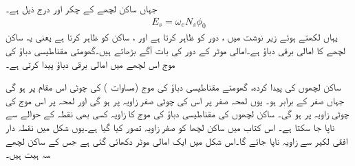 جہاں  ساکن لچھے کے چکر  اور  درج ذیل ہے۔
\begin{align}\label{مساوات_امالی_ساکن_لچھوں_میں_امالی_برقی_دباو}
E_s=\omega_e N_s \phi_0
\end{align}
یہاں   لکھتے ہوئے  زیر نوشت  میں  ،  دور  کو ظاہر کرتا ہے اور ، ساکن کو ظاہر کرتا ہے یعنی یہ ساکن   لچھے کا امالی برقی دباؤ ہے۔امالی موٹر کے  دور   کی بات آگے بڑھاتے ہیں۔گھومتی مقناطیسی دباؤ کی موج اس  لچھے میں امالی برقی دباؤ  پیدا کرتی ہے۔

ساکن لچھوں کی پیدا کردہ، گھومتے مقناطیسی دباؤ کی موج (مساوات )  کی چوٹی اس مقام پر ہو گی جہاں  صفر کے برابر ہو۔ یوں لمحہ صفر پر اس کی چوٹی صفر زاویہ
  پر ہو گی اور لمحہ  پر اس موج کی چوٹی زاویہ  پر ہو گی۔ ساکن لچھوں کی مقناطیسی دباؤ کی موج کا زاویہ کسی بھی نقطہ کے حوالے سے ناپا  جا سکتا ہے۔ اس کتاب میں ساکن لچھا   کو صفر زاویہ تصور کیا گیا ہے۔یوں شکل   میں  نقطہ دار افقی لکیر سے  زاویہ   ناپا جائے گا۔اس شکل میں ایک امالی موٹر دکھائی گئی ہے جس کے  ساکن لچھے سہ ہیت ہیں۔
